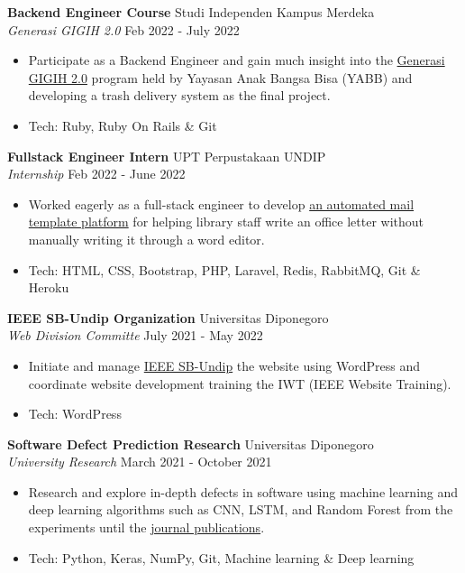 \documentclass[a4paper]{article}
\begin{document}
\textbf{Backend Engineer Course} \hfill Studi Independen Kampus Merdeka \\
\textit{Generasi GIGIH 2.0} \hfill Feb 2022 - July 2022\\
\vspace{-1mm}
\begin{itemize} \itemsep 1pt
	\item Participate as a Backend Engineer and gain much insight into the \href{https://www.anakbangsabisa.org/generasi-gigih/}{Generasi GIGIH 2.0} program held by Yayasan Anak Bangsa Bisa (YABB) and developing a trash delivery system as the final project.
	\item Tech: Ruby, Ruby On Rails \& Git
\end{itemize}

\textbf{Fullstack Engineer Intern} \hfill UPT Perpustakaan UNDIP \\
\textit{Internship} \hfill Feb 2022 - June 2022\\
\vspace{-1mm}
\begin{itemize} \itemsep 1pt
	\item Worked eagerly as a full-stack engineer to develop \href{http://template-surat-testing.herokuapp.com/}{an automated mail template platform} for helping library staff write an office letter without manually writing it through a word editor.
	\item Tech: HTML, CSS, Bootstrap, PHP, Laravel, Redis, RabbitMQ, Git \& Heroku
\end{itemize}

\textbf{IEEE SB-Undip Organization} \hfill Universitas Diponegoro\\
\textit{Web Division Committe} \hfill July 2021 - May 2022\\
\vspace{-1mm}
\begin{itemize} \itemsep 1pt
	\item Initiate and manage \href{https://edu.ieee.org/id-undip/}{IEEE SB-Undip} the website using WordPress and coordinate website development training the IWT (IEEE Website Training).
	\item Tech: WordPress
\end{itemize}

\textbf{Software Defect Prediction Research} \hfill Universitas Diponegoro\\
\textit{University Research} \hfill March 2021 - October 2021\\
\vspace{-1mm}
\begin{itemize} \itemsep 1pt
	\item Research and explore in-depth defects in software using machine learning and deep learning algorithms such as CNN, LSTM, and Random Forest from the experiments until the
	\href{https://github.com/mhnaufal/Software-Defect-Finale/blob/main/reports/PAPER-Software%20Defect%20Prediction.pdf}{journal publications}.
	\item Tech: Python, Keras, NumPy, Git, Machine learning \& Deep learning
\end{itemize}
\end{document}
